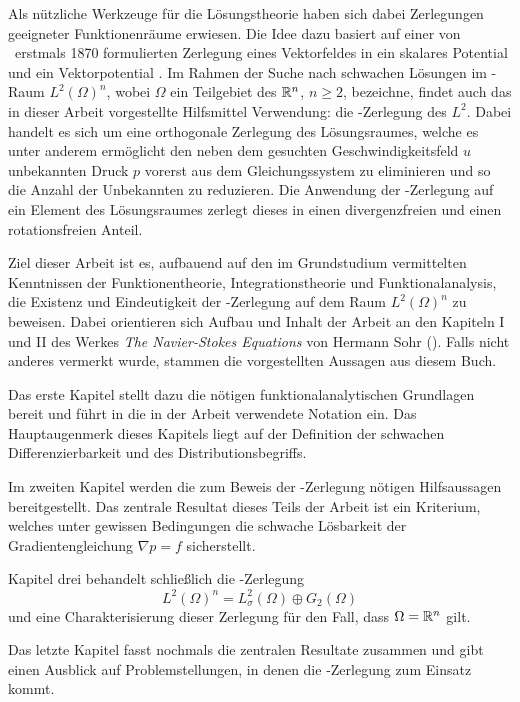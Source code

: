 Als nützliche Werkzeuge für die Lösungstheorie haben sich dabei Zerlegungen geeigneter Funktionenräume erwiesen. Die Idee dazu basiert auf einer von \helmholtz\ erstmals 1870 formulierten Zerlegung eines Vektorfeldes in ein skalares Potential und ein Vektorpotential \cite{helmholtz}.
Im Rahmen der Suche nach schwachen Lösungen im \hilbert\hyp{}Raum $L^2(\Omega)^n$, wobei $\Omega$ ein Teilgebiet des $\mathbb{R}^n$, $n \geq 2$, bezeichne, findet auch das in dieser Arbeit vorgestellte Hilfsmittel Verwendung: die \helmholtz\hyp{}Zerlegung des $L^2$.
Dabei handelt es sich um eine orthogonale Zerlegung des Lösungsraumes, welche es unter anderem ermöglicht den neben dem gesuchten Geschwindigkeitsfeld $u$ unbekannten Druck $p$ vorerst aus dem Gleichungssystem zu eliminieren und so die Anzahl der Unbekannten zu reduzieren.
Die Anwendung der \helmholtz\hyp{}Zerlegung auf ein Element des Lösungsraumes zerlegt dieses in einen divergenzfreien und einen rotationsfreien Anteil.

Ziel dieser Arbeit ist es, aufbauend auf den im Grundstudium vermittelten Kenntnissen der Funktionentheorie, Integrationstheorie und Funktionalanalysis, die Existenz und Eindeutigkeit der \helmholtz\hyp{}Zerlegung auf dem Raum $L^2(\Omega)^n$ zu beweisen.
Dabei orientieren sich Aufbau und Inhalt der Arbeit an den Kapiteln I und II des Werkes \emph{The Navier-Stokes Equations} von Hermann Sohr (\cite{sohr2001navier}).
Falls nicht anderes vermerkt wurde, stammen die vorgestellten Aussagen aus diesem Buch.

Das erste Kapitel stellt dazu die nötigen funktionalanalytischen Grundlagen bereit und führt in die in der Arbeit verwendete Notation ein.
Das Hauptaugenmerk dieses Kapitels liegt auf der Definition der schwachen Differenzierbarkeit und des Distributionsbegriffs.

Im zweiten Kapitel werden die zum Beweis der \helmholtz\hyp{}Zerlegung nötigen Hilfsaussagen bereitgestellt.
Das zentrale Resultat dieses Teils der Arbeit ist ein Kriterium, welches unter gewissen Bedingungen die schwache Lösbarkeit der Gradientengleichung $\nabla p = f$ sicherstellt.

Kapitel drei behandelt schließlich die \helmholtz\hyp{}Zerlegung $$L^2(\Omega)^n = L^2_\sigma(\Omega) \oplus G_2(\Omega)$$ und eine Charakterisierung dieser Zerlegung für den Fall, dass $\Omega = \mathbb{R}^n$ gilt.

Das letzte Kapitel fasst nochmals die zentralen Resultate zusammen und gibt einen Ausblick auf Problemstellungen, in denen die \helmholtz\hyp{}Zerlegung zum Einsatz kommt.
